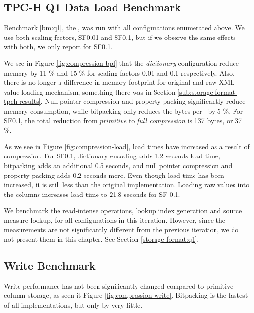 \subsection{TPC-H Q1 Data Load Benchmark}
Benchmark \ref{bm:q1}, the \tpchdl, was run with all configurations enumerated above. We use both scaling factors, SF0.01 and SF0.1, but if we observe the same effects with both, we only report for SF0.1.

We see in Figure \ref{fig:compression-bpl} that the \textit{dictionary} configuration reduce memory by 11 \% and 15 \% for scaling factors 0.01 and 0.1 respectively. Also, there is no longer a difference in memory footprint for original and raw XML value loading mechanism, something there was in Section \ref{sub:storage-format-tpch-results}. Null pointer compression and property packing significantly reduce memory consumption, while bitpacking only reduces the bytes per \lineitem~by 5 \%. For SF0.1, the total reduction from \textit{primitive} to \textit{full compression} is 137 bytes, or 37 \%.

As we see in Figure \ref{fig:compression-load}, load times have increased as a result of compression. For SF0.1, dictionary encoding adds 1.2 seconds load time, bitpacking adds an additional 0.5 seconds, and null pointer compression and property packing adds 0.2 seconds more. Even though load time has been increased, it is still less than the original implementation. Loading raw values into the columns increases load time to 21.8 seconds for SF 0.1. 

We benchmark the read-intense operations, lookup index generation and source measure lookup, for all configurations in this iteration. However, since the measurements are not significantly different from the previous iteration, we do not present them in this chapter. See Section \ref{storage-format:q1}.

\subsection{Write Benchmark}
\label{compression:write}
Write performance has not been significantly changed compared to primitive column storage, as seen it Figure \ref{fig:compression-write}. Bitpacking is the fastest of all implementations, but only by very little.

